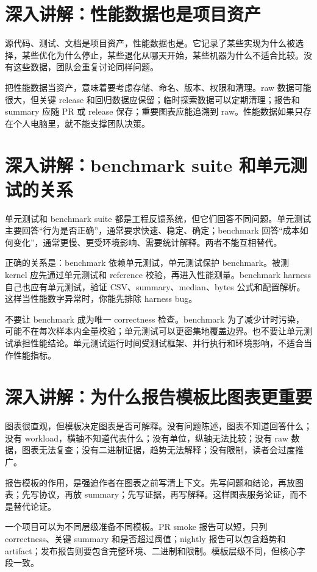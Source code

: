 \section{深入讲解：性能数据也是项目资产}

源代码、测试、文档是项目资产，性能数据也是。它记录了某些实现为什么被选择，某些优化为什么停止，某些退化从哪天开始，某些机器为什么不适合比较。没有这些数据，团队会重复讨论同样问题。

把性能数据当资产，意味着要考虑存储、命名、版本、权限和清理。raw 数据可能很大，但关键 release 和回归数据应保留；临时探索数据可以定期清理；报告和 summary 应随 PR 或 release 保存；重要图表应能追溯到 raw。性能数据如果只存在个人电脑里，就不能支撑团队决策。

\section{深入讲解：benchmark suite 和单元测试的关系}

单元测试和 benchmark suite 都是工程反馈系统，但它们回答不同问题。单元测试主要回答“行为是否正确”，通常要求快速、稳定、确定；benchmark 回答“成本如何变化”，通常更慢、更受环境影响、需要统计解释。两者不能互相替代。

正确的关系是：benchmark 依赖单元测试，单元测试保护 benchmark。被测 kernel 应先通过单元测试和 reference 校验，再进入性能测量。benchmark harness 自己也应有单元测试，验证 CSV、summary、median、bytes 公式和配置解析。这样当性能数字异常时，你能先排除 harness bug。

不要让 benchmark 成为唯一 correctness 检查。benchmark 为了减少计时污染，可能不在每次样本内全量校验；单元测试可以更密集地覆盖边界。也不要让单元测试承担性能结论。单元测试运行时间受测试框架、并行执行和环境影响，不适合当作性能指标。

\section{深入讲解：为什么报告模板比图表更重要}

图表很直观，但模板决定图表是否可解释。没有问题陈述，图表不知道回答什么；没有 workload，横轴不知道代表什么；没有单位，纵轴无法比较；没有 raw 数据，图表无法复查；没有二进制证据，趋势无法解释；没有限制，读者会过度推广。

报告模板的作用，是强迫作者在图表之前写清上下文。先写问题和结论，再放图表；先写协议，再放 summary；先写证据，再写解释。这样图表服务论证，而不是替代论证。

一个项目可以为不同层级准备不同模板。PR smoke 报告可以短，只列 correctness、关键 summary 和是否超过阈值；nightly 报告可以包含趋势和 artifact；发布报告则要包含完整环境、二进制和限制。模板层级不同，但核心字段一致。

